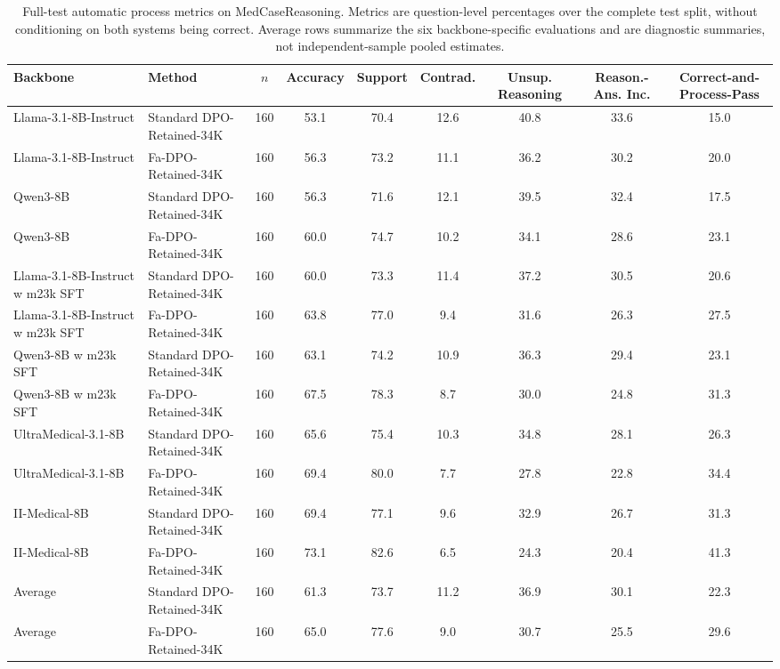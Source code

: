 \documentclass[a4paper,fleqn,doubleblind]{cas-sc}
\begin{document}
\begin{table}[htbp]
    \centering
    \scriptsize
    \setlength{\tabcolsep}{3pt}
    \caption{Full-test automatic process metrics on MedCaseReasoning. Metrics are question-level percentages over the complete test split, without conditioning on both systems being correct. Average rows summarize the six backbone-specific evaluations and are diagnostic summaries, not independent-sample pooled estimates.}
    \label{tab:full_set_process_metrics}
    \begin{adjustbox}{max width=\textwidth}
    \begin{tabular}{llccccccc}
        \toprule
        \textbf{Backbone} & \textbf{Method} & \textbf{$n$} & \textbf{Accuracy} & \textbf{Support} & \textbf{Contrad.} & \textbf{Unsup. Reasoning} & \textbf{Reason.-Ans. Inc.} & \textbf{Correct-and-Process-Pass} \\
        \midrule
        Llama-3.1-8B-Instruct & Standard DPO-Retained-34K & 160 & 53.1 & 70.4 & 12.6 & 40.8 & 33.6 & 15.0 \\
        Llama-3.1-8B-Instruct & Fa-DPO-Retained-34K & 160 & 56.3 & 73.2 & 11.1 & 36.2 & 30.2 & 20.0 \\
        Qwen3-8B & Standard DPO-Retained-34K & 160 & 56.3 & 71.6 & 12.1 & 39.5 & 32.4 & 17.5 \\
        Qwen3-8B & Fa-DPO-Retained-34K & 160 & 60.0 & 74.7 & 10.2 & 34.1 & 28.6 & 23.1 \\
        Llama-3.1-8B-Instruct w m23k SFT & Standard DPO-Retained-34K & 160 & 60.0 & 73.3 & 11.4 & 37.2 & 30.5 & 20.6 \\
        Llama-3.1-8B-Instruct w m23k SFT & Fa-DPO-Retained-34K & 160 & 63.8 & 77.0 & 9.4 & 31.6 & 26.3 & 27.5 \\
        Qwen3-8B w m23k SFT & Standard DPO-Retained-34K & 160 & 63.1 & 74.2 & 10.9 & 36.3 & 29.4 & 23.1 \\
        Qwen3-8B w m23k SFT & Fa-DPO-Retained-34K & 160 & 67.5 & 78.3 & 8.7 & 30.0 & 24.8 & 31.3 \\
        UltraMedical-3.1-8B & Standard DPO-Retained-34K & 160 & 65.6 & 75.4 & 10.3 & 34.8 & 28.1 & 26.3 \\
        UltraMedical-3.1-8B & Fa-DPO-Retained-34K & 160 & 69.4 & 80.0 & 7.7 & 27.8 & 22.8 & 34.4 \\
        II-Medical-8B & Standard DPO-Retained-34K & 160 & 69.4 & 77.1 & 9.6 & 32.9 & 26.7 & 31.3 \\
        II-Medical-8B & Fa-DPO-Retained-34K & 160 & 73.1 & 82.6 & 6.5 & 24.3 & 20.4 & 41.3 \\
        \midrule
        Average & Standard DPO-Retained-34K & 160 & 61.3 & 73.7 & 11.2 & 36.9 & 30.1 & 22.3 \\
        Average & Fa-DPO-Retained-34K & 160 & 65.0 & 77.6 & 9.0 & 30.7 & 25.5 & 29.6 \\
        \bottomrule
    \end{tabular}
    \end{adjustbox}
\end{table}
\end{document}
